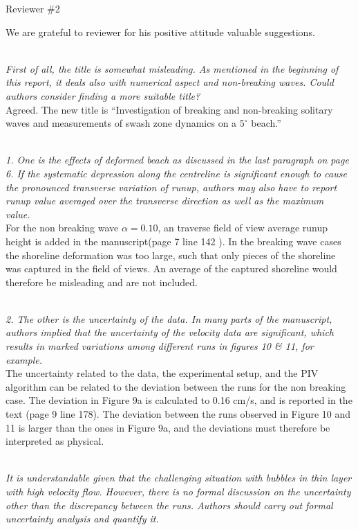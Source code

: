 \documentclass[11pt]{article}
\begin{document}
\newcommand{\refpoint}[1]{\ \vspace{0.3cm}\\ {\em #1}\  \vspace{0.3cm}\\ }
\newcommand{\todo}[1]{\ \\ {\bf To do: #1}}

Reviewer \#2

We are grateful to reviewer for his positive attitude valuable suggestions.

\refpoint{First of all, the title is somewhat misleading. As mentioned in the beginning of this report, it deals also with 
numerical aspect and non-breaking waves. Could authors consider finding a more suitable title?}
Agreed.
The new title is ``Investigation of breaking and non-breaking solitary waves and measurements of swash zone dynamics on 
a $5^\circ$ beach.''

\refpoint{1. One is the effects of deformed beach as discussed in the last paragraph on page 6. If the systematic depression along the centreline is significant enough to cause the pronounced transverse variation of runup, authors may also have to report runup value averaged over the transverse direction as well as the maximum value.}

For the non breaking wave $\alpha =0.10$, an traverse field of view average runup height is added in the manuscript(page 7 line 142 ). In the breaking wave cases the shoreline deformation was too large, such that only pieces of the shoreline was captured in the field of views. An average of the captured shoreline would therefore be misleading and are not included. 

\refpoint{2. The other is the uncertainty of the data. In many parts of the manuscript, authors implied that the uncertainty of the velocity data are significant, which results in marked variations among different runs in figures 10 \& 11, for example.}

The uncertainty related to the data, the experimental setup, and the PIV algorithm can be related to the deviation between the runs for the non breaking case. The deviation in Figure 9a is calculated to 0.16 cm/s, and is reported in the text (page 9  line 178). The deviation between the runs observed in Figure 10 and 11 is larger than the ones in Figure 9a, and the deviations must therefore be interpreted as physical.


\refpoint{ It is understandable given that the challenging situation with bubbles in thin layer with high velocity flow. However, there is no formal discussion on the uncertainty other than the discrepancy between the runs. Authors should carry out formal uncertainty analysis and quantify it.}
\end{document}
